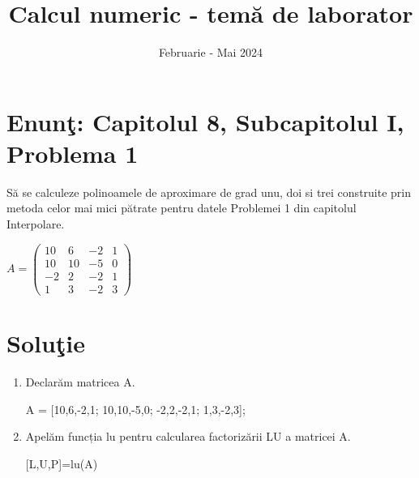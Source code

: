\documentclass{article}
\begin{document}
\title{Calcul numeric - tem\u{a} de laborator}

\author{}

\date{Februarie - Mai 2024}

\maketitle              %








\section*{Enun\c{t}: Capitolul 8, Subcapitolul I, Problema 1}

S\u{a} se calculeze polinoamele de aproximare de grad unu, doi si trei construite prin metoda celor mai mici pătrate pentru datele Problemei 1 din capitolul Interpolare.
\begin{center}
$
A=\begin{pmatrix}
10 & 6 & -2 & 1\\
10 & 10 & -5 & 0\\
-2 & 2 & -2 & 1\\
1 & 3 & -2 & 3
\end{pmatrix}
$
\end{center}

\section*{Solu\c{t}ie}

\begin{center}
\begin{enumerate}
    \item 
    Declarăm matricea A. \\
    \begin{center}
    A = [10,6,-2,1; 10,10,-5,0; -2,2,-2,1; 1,3,-2,3];
    \end{center}
    \item 
    Apelăm funcția lu pentru calcularea factorizării LU a matricei A. \\
    \begin{center}
    [L,U,P]=lu(A)
    \end{center}
\end{enumerate}
\end{center}
\end{document}
